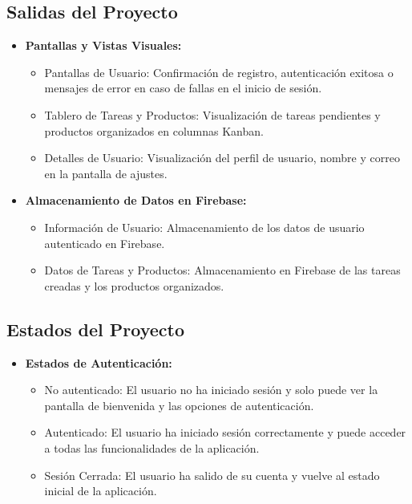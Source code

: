 \documentclass{article}
\begin{document}
\begin{itemize}
\subsection{Salidas del Proyecto}
    \begin{itemize}
        \item \textbf{Pantallas y Vistas Visuales:}
        \begin{itemize}
            \item Pantallas de Usuario: Confirmación de registro, autenticación exitosa o mensajes de error en caso de fallas en el inicio de sesión.
            \item Tablero de Tareas y Productos: Visualización de tareas pendientes y productos organizados en columnas Kanban.
            \item Detalles de Usuario: Visualización del perfil de usuario, nombre y correo en la pantalla de ajustes.
        \end{itemize}
        
        \item \textbf{Almacenamiento de Datos en Firebase:}
        \begin{itemize}
            \item Información de Usuario: Almacenamiento de los datos de usuario autenticado en Firebase.
            \item Datos de Tareas y Productos: Almacenamiento en Firebase de las tareas creadas y los productos organizados.
        \end{itemize}
        
      
    \end{itemize}

    \subsection{Estados del Proyecto}
    \begin{itemize}
        \item \textbf{Estados de Autenticación:}
        \begin{itemize}
            \item No autenticado: El usuario no ha iniciado sesión y solo puede ver la pantalla de bienvenida y las opciones de autenticación.
            \item Autenticado: El usuario ha iniciado sesión correctamente y puede acceder a todas las funcionalidades de la aplicación.
            \item Sesión Cerrada: El usuario ha salido de su cuenta y vuelve al estado inicial de la aplicación.
        \end{itemize}
        

\end{itemize}
\end{itemize}
\end{document}
